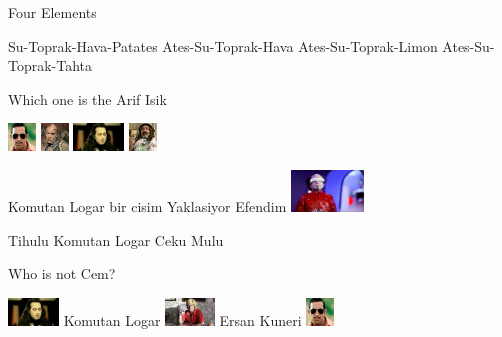\documentclass{exam}
\begin{document}
\begin{questions}
\question Four Elements\newline
\begin{oneparchoices}
\choice Su-Toprak-Hava-Patates
\choice Ates-Su-Toprak-Hava
\choice Ates-Su-Toprak-Limon
\choice Ates-Su-Toprak-Tahta
\end{oneparchoices}
\question Which one is the Arif Isik\newline
\begin{oneparchoices}
\choice \includegraphics[height=2em]{arifisik.jpg}
\choice \includegraphics[height=2em]{216.jpg}
\choice \includegraphics[height=2em]{komutanlogar.jpeg}
\choice \includegraphics[height=2em]{faruk.jpg}
\end{oneparchoices}
\question Komutan Logar bir cisim Yaklasiyor Efendim\newline
\includegraphics[height=3em]{tihulu.jpeg} \newline
\begin{oneparchoices}
\choice Tihulu
\choice Komutan Logar
\choice Ceku
\choice Mulu
\end{oneparchoices}
\question Who is not Cem?\newline
\begin{oneparchoices}
\choice \includegraphics[height=2em]{komutanlogar.jpeg}
Komutan Logar
\choice \includegraphics[height=2em]{ersan.jpg}
Ersan Kuneri
\choice \includegraphics[height=2em]{arifisik.jpg}

\end{oneparchoices}
\end{questions}
\end{document}
